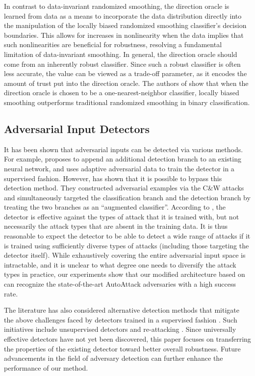 \documentclass[11pt, letterpaper]{article}
\theoremstyle{plain}
\theoremstyle{definition}
\begin{document}
In contrast to data-invariant randomized smoothing, the direction oracle  is learned from data as a means to incorporate the data distribution directly into the manipulation of the locally biased randomized smoothing classifier's decision boundaries. This allows for increases in nonlinearity when the data implies that such nonlinearities are beneficial for robustness, resolving a fundamental limitation of data-invariant smoothing. In general, the direction oracle should come from an inherently robust classifier. Since such a robust classifier  is often less accurate, the value  can be viewed as a trade-off parameter, as it encodes the amount of trust put into the direction oracle. The authors of \citep{Anderson21b} show that when the direction oracle is chosen to be a one-nearest-neighbor classifier, locally biased smoothing outperforms traditional randomized smoothing in binary classification. 


\subsection{Adversarial Input Detectors}

It has been shown that adversarial inputs can be detected via various methods. For example, \citep{Metzen17} proposes to append an additional detection branch to an existing neural network, and uses adaptive adversarial data to train the detector in a supervised fashion. However, \citep{Carlini17b} has shown that it is possible to bypass this detection method. They constructed adversarial examples via the C\&W attacks \citep{Carlini17a} and simultaneously targeted the classification branch and the detection branch by treating the two branches as an ``augmented classifier''. According to \citep{Carlini17b}, the detector is effective against the types of attack that it is trained with, but not necessarily the attack types that are absent in the training data. It is thus reasonable to expect the detector to be able to detect a wide range of attacks if it is trained using sufficiently diverse types of attacks (including those targeting the detector itself). While exhaustively covering the entire adversarial input space is intractable, and it is unclear to what degree one needs to diversify the attack types in practice, our experiments show that our modified architecture based on \citep{Metzen17} can recognize the state-of-the-art AutoAttack adversaries with a high success rate.

The literature has also considered alternative detection methods that mitigate the above challenges faced by detectors trained in a supervised fashion \citep{Carrara19}. Such initiatives include unsupervised detectors \citep{Aldahdooh21a, Aldahdooh21b} and re-attacking \citep{Ahmadi21}. Since universally effective detectors have not yet been discovered, this paper focuses on transferring the properties of the existing detector toward better overall robustness. Future advancements in the field of adversary detection can further enhance the performance of our method.
\end{document}
